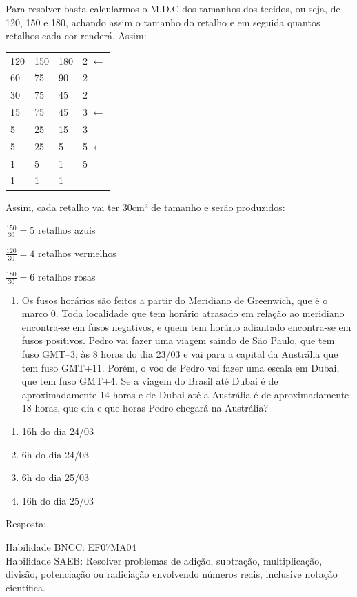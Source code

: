 Para resolver basta calcularmos o M.D.C dos tamanhos dos tecidos, ou
seja, de 120, 150 e 180, achando assim o tamanho do retalho e em seguida
quantos retalhos cada cor renderá. Assim:

\begin{longtable}[]{@{}llll@{}}
\toprule
\endhead
120 & 150 & 180 & 2 \(\leftarrow\)\tabularnewline
60 & 75 & 90 & 2\tabularnewline
30 & 75 & 45 & 2\tabularnewline
15 & 75 & 45 & 3 \(\leftarrow\)\tabularnewline
5 & 25 & 15 & 3\tabularnewline
5 & 25 & 5 & 5 \(\leftarrow\)\tabularnewline
1 & 5 & 1 & 5\tabularnewline
1 & 1 & 1 &\tabularnewline
\bottomrule
\end{longtable}

Assim, cada retalho vai ter 30cm² de tamanho e serão produzidos:

\(\frac{150}{30} = 5\) retalhos azuis

\(\frac{120}{30} = 4\) retalhos vermelhos

\(\frac{180}{30} = 6\) retalhos rosas


\begin{enumerate}
\def\labelenumi{\arabic{enumi})}
\tightlist
\item
  Os fusos horários são feitos a partir do Meridiano de Greenwich, que é
  o marco 0. Toda localidade que tem horário atrasado em relação ao
  meridiano encontra-se em fusos negativos, e quem tem horário adiantado
  encontra-se em fusos positivos. Pedro vai fazer uma viagem saindo de
  São Paulo, que tem fuso GMT--3, às 8 horas do dia 23/03 e vai para a
  capital da Austrália que tem fuso GMT+11. Porém, o voo de Pedro vai
  fazer uma escala em Dubai, que tem fuso GMT+4. Se a viagem do Brasil
  até Dubai é de aproximadamente 14 horas e de Dubai até a Austrália é
  de aproximadamente 18 horas, que dia e que horas Pedro chegará na
  Austrália?
\end{enumerate}

\begin{enumerate}
\def\labelenumi{\alph{enumi})}
\item
  16h do dia 24/03
\item
  6h do dia 24/03
\item
  6h do dia 25/03
\item
  16h do dia 25/03
\end{enumerate}

Resposta:

Habilidade BNCC: EF07MA04\\
Habilidade SAEB: Resolver problemas de adição, subtração, multiplicação,
divisão, potenciação ou radiciação envolvendo números reais, inclusive
notação científica.

